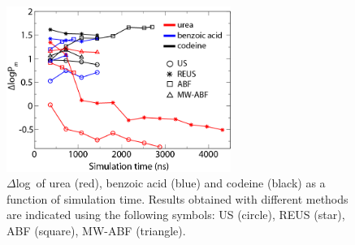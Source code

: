   \begin{figure}
    \centering
    \includegraphics[width=0.65\textwidth]{2015-permeability/Figures/dlogP-recolor.png}
    \caption{ $\Delta$log\perm~of urea (red), benzoic acid (blue) and codeine (black) as a function of simulation time. %
    Results obtained with different methods are indicated using the following symbols: US (circle), REUS (star), ABF (square), MW-ABF (triangle). }
    \label{fig:deltaP}
  \end{figure}
